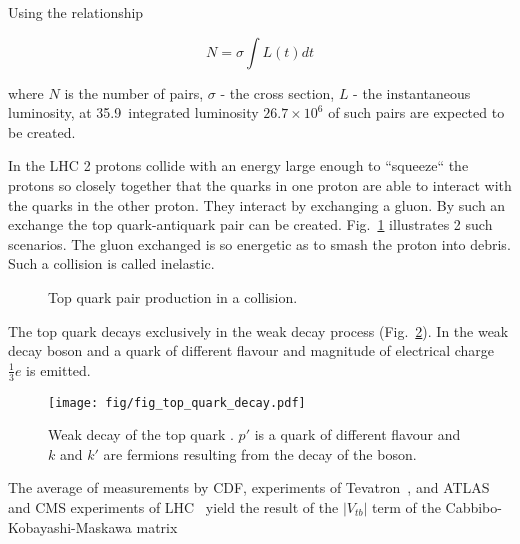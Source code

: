 Using the relationship

\begin{equation}
N=\sigma\int L(t)dt
\end{equation}

where $N$ is the number of \ttbar pairs, $\sigma$ - the \ttbar cross section, $L$ - the instantaneous luminosity, at 35.9~\fbinv integrated luminosity $26.7\times10^{6}$ of such pairs are expected to be created. 

In the LHC 2 protons collide with an energy large enough to ``squeeze`` the protons so closely together that the quarks in one proton are able to interact with the quarks in the other proton. They interact by exchanging a gluon. By such an exchange the top quark-antiquark pair can be created. Fig.~\ref{fig:top_quark_productions} illustrates 2 such scenarios. The gluon exchanged is so energetic as to smash the proton into debris. Such a collision is called inelastic.

\begin{figure}[h!]
  \centering
  \def\twidth{0.45}
  \hfil
  \caption{Top quark pair production in a \Pp\Pp collision.}
  \label{fig:top_quark_productions}
\end{figure}

The top quark decays exclusively in the weak decay process (Fig.~\ref{fig:quark_decay}). In the weak decay \PW boson and a quark of different flavour and magnitude of electrical charge $\frac{1}{3}e$ is emitted. 

\begin{figure}[H]
  \centering
  \texttt{[image: fig/fig\_top\_quark\_decay.pdf]}
  \caption{Weak decay of the top quark \cPqt. $p'$ is a quark of different flavour and $k$ and $k'$ are fermions resulting from the decay of the \PW boson.}
  \label{fig:quark_decay}
\end{figure}

The average of measurements by CDF, \DZERO experiments of Tevatron~\cite{Aaltonen:2015cra}, and ATLAS and CMS experiments of LHC~\cite{twiki:tt_curve_toplhcwg_sep18} yield the result of the $|V_{tb}|$ term of the Cabbibo-Kobayashi-Maskawa matrix

